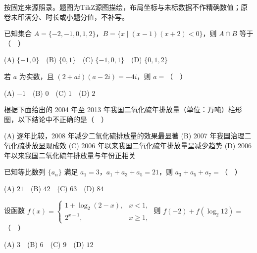 

\begin{gktip}
按固定来源照录。题图为TikZ源图描绘，布局坐标与未标数据不作精确数值；原卷未印满分、时长或小题分值，不补写。
\end{gktip}


\begin{question}
已知集合 $A=\{-2,-1,0,1,2\}$，$B=\{x\mid (x-1)(x+2)<0\}$，则 $A\cap B$ 等于（　）

(A) $\{-1,0\}$　(B) $\{0,1\}$　(C) $\{-1,0,1\}$　(D) $\{0,1,2\}$

\end{question}
\begin{question}
若 $a$ 为实数，且 $(2+ai)(a-2i)=-4i$，则 $a=$（　）

(A) $-1$　(B) $0$　(C) $1$　(D) $2$

\Needspace{0.4\textheight}
\end{question}
\begin{question}
根据下面给出的 2004 年至 2013 年我国二氧化硫年排放量（单位：万吨）柱形图，以下结论中不正确的是（　）
\nopagebreak[4]
\begin{center}\end{center}
\nopagebreak[4]
(A) 逐年比较，2008 年减少二氧化硫排放量的效果最显著  
(B) 2007 年我国治理二氧化硫排放显现成效  
(C) 2006 年以来我国二氧化硫年排放量呈减少趋势  
(D) 2006 年以来我国二氧化硫年排放量与年份正相关

\end{question}
\begin{question}
已知等比数列 $\{a_n\}$ 满足 $a_1=3$，$a_1+a_3+a_5=21$，则 $a_3+a_5+a_7=$（　）

(A) $21$　(B) $42$　(C) $63$　(D) $84$

\end{question}
\begin{question}
设函数
$\displaystyle f(x)=\begin{cases}1+\log_2(2-x),&x<1,\\2^{x-1},&x\geqslant1,\end{cases}$
则 $f(-2)+f(\log_2 12)=$（　）

(A) $3$　(B) $6$　(C) $9$　(D) $12$

\Needspace{0.4\textheight}
\end{question}
